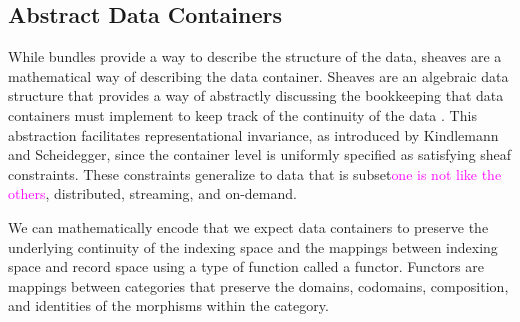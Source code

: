 \documentclass[journal]{IEEEtran}
\newcommand{\note}[1]{\textcolor{magenta}{#1}}
\theoremstyle{definition}
\theoremstyle{remark}
\begin{document}
\subsection{Abstract Data Containers}
\label{sec:atct:sheaves}
While bundles provide a way to describe the structure of the data, sheaves are a mathematical way of describing the data container. Sheaves are an algebraic data structure that provides a way of abstractly discussing the bookkeeping that data containers must implement to keep track of the continuity of the data \cite{ghristElementaryAppliedTopology2014}. This abstraction facilitates representational invariance, as introduced by Kindlemann and Scheidegger\cite{kindlmannAlgebraicProcessVisualization2014}, since the container level is uniformly specified as satisfying sheaf constraints. These constraints generalize to data that is subset\note{one is not like the others}, distributed, streaming, and on-demand.


We can mathematically encode that we expect data containers to preserve the underlying continuity of the indexing space and the mappings between indexing space and record space using a type of function called a functor. Functors are mappings between categories that preserve the domains, codomains, composition, and identities of the morphisms within the category\cite{riehlCategoryTheoryContext}.
\end{document}
